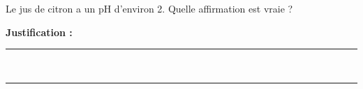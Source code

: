Le jus de citron a un pH d'environ \num{2}. Quelle affirmation est vraie ?

\choices

\noindent\textbf{Justification :} \hrulefill \\[2.5ex]
\rule{\linewidth}{0.4pt} \\[2.5ex]
\rule{\linewidth}{0.4pt}
\vfill
